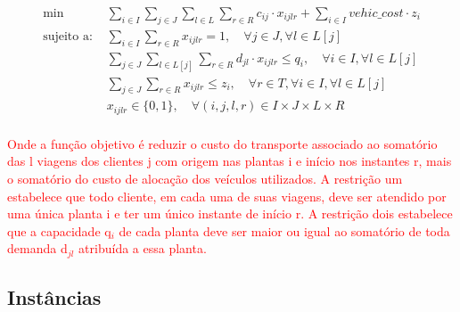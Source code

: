 \begin{align}
\label{eq1: obj} \min & \sum_{i \in I} \sum_{j \in J} \sum_{l \in L} \sum_{r \in R} c_{ij} \cdot x_{ijlr} + \sum_{i \in I} vehic\_cost \cdot z_i \\
\text{sujeito a: }
\label{eq2: demand} & \sum_{i \in I} \sum_{r \in R} x_{ijlr} = 1, \quad \forall j \in J, \forall l \in L[j] \\
\label{eq3: capacity} & \sum_{j \in J}\sum_{l \in L[j]} \sum_{r \in R} d_{jl} \cdot x_{ijlr} \leq q_i, \quad \forall i \in I, \forall l \in L[j] \\
\label{eq4: trucks} & \sum_{j \in J} \sum_{r \in R} x_{ijlr} \leq z_i, \quad \forall r \in T, \forall i \in I, \forall l \in L[j] \\
\label{eq7: binary_x} & x_{ijlr} \in \{0, 1\}, \quad \forall (i, j, l, r) \in I \times J \times L \times R \\
\end{align}

\textcolor{red}{Onde a função objetivo é reduzir o custo do transporte associado ao somatório das l viagens dos clientes j  com origem nas plantas i e início nos instantes r, mais o somatório do custo de alocação dos veículos utilizados. A restrição um estabelece que todo cliente, em cada uma de suas viagens, deve ser atendido por uma única planta i e ter um único instante de início r. A restrição dois estabelece que a capacidade q$_i$ de cada planta deve ser maior ou igual ao somatório de toda demanda d$_{jl}$ atribuída a essa planta. }
\subsection*{Instâncias}
\label{sec:instcomp}


